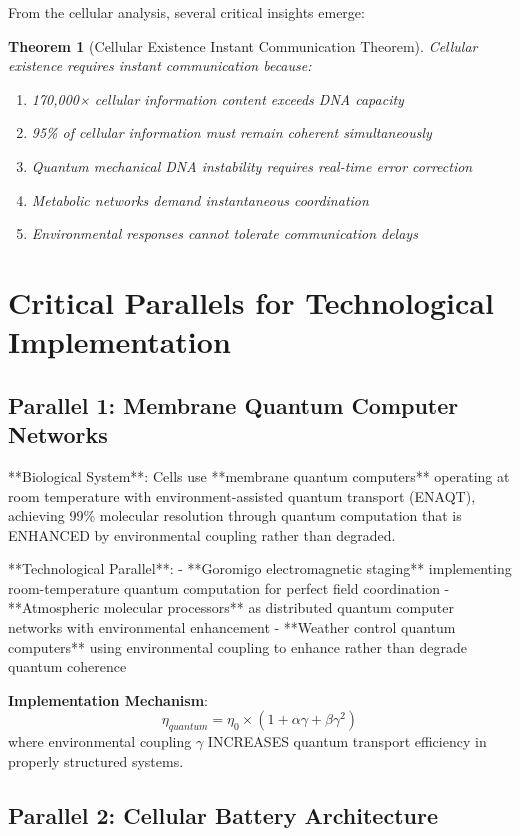 \documentclass[12pt,a4paper]{article}
\newtheorem{theorem}{Theorem}[section]
\begin{document}
From the cellular analysis, several critical insights emerge:

\begin{theorem}[Cellular Existence Instant Communication Theorem]
Cellular existence requires instant communication because:
\begin{enumerate}
\item 170,000× cellular information content exceeds DNA capacity
\item 95\% of cellular information must remain coherent simultaneously
\item Quantum mechanical DNA instability requires real-time error correction
\item Metabolic networks demand instantaneous coordination
\item Environmental responses cannot tolerate communication delays
\end{enumerate}
\end{theorem}

\section{Critical Parallels for Technological Implementation}

\subsection{Parallel 1: Membrane Quantum Computer Networks}

**Biological System**: Cells use **membrane quantum computers** operating at room temperature with environment-assisted quantum transport (ENAQT), achieving 99\% molecular resolution through quantum computation that is ENHANCED by environmental coupling rather than degraded.

**Technological Parallel**: 
- **Goromigo electromagnetic staging** implementing room-temperature quantum computation for perfect field coordination
- **Atmospheric molecular processors** as distributed quantum computer networks with environmental enhancement
- **Weather control quantum computers** using environmental coupling to enhance rather than degrade quantum coherence

\textbf{Implementation Mechanism}:
$$\eta_{quantum} = \eta_0 \times (1 + \alpha \gamma + \beta \gamma^2)$$
where environmental coupling $\gamma$ INCREASES quantum transport efficiency in properly structured systems.

\subsection{Parallel 2: Cellular Battery Architecture}
\end{document}

